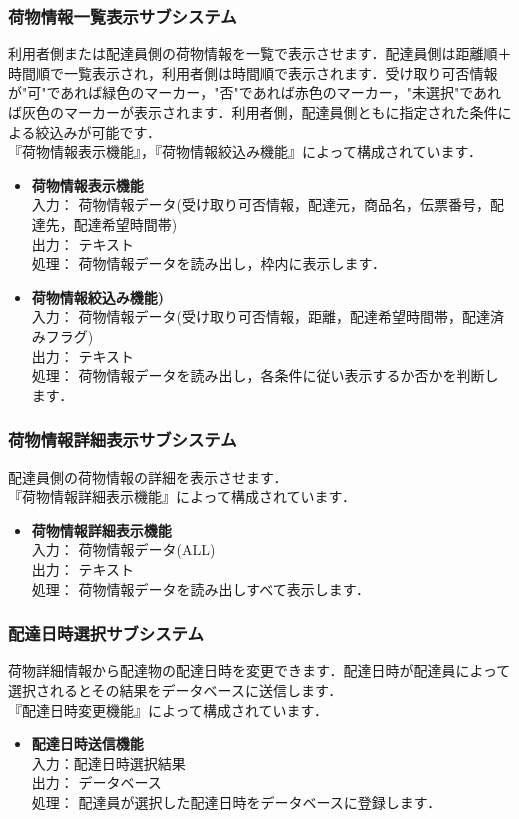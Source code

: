 \documentclass[a4j,titlepage]{jarticle}
\begin{document}
\subsubsection{荷物情報一覧表示サブシステム}
利用者側または配達員側の荷物情報を一覧で表示させます．配達員側は距離順＋時間順で一覧表示され，利用者側は時間順で表示されます．受け取り可否情報が"可"であれば緑色のマーカー，"否"であれば赤色のマーカー，"未選択"であれば灰色のマーカーが表示されます．利用者側，配達員側ともに指定された条件による絞込みが可能です．\\
『荷物情報表示機能』，『荷物情報絞込み機能』によって構成されています．
\begin{itemize}
\item \textbf{荷物情報表示機能} \\
入力： 荷物情報データ(受け取り可否情報，配達元，商品名，伝票番号，配達先，配達希望時間帯) \\
出力： テキスト \\
処理： 荷物情報データを読み出し，枠内に表示します．
\item \textbf{荷物情報絞込み機能)} \\
入力： 荷物情報データ(受け取り可否情報，距離，配達希望時間帯，配達済みフラグ) \\
出力： テキスト \\
処理： 荷物情報データを読み出し，各条件に従い表示するか否かを判断します．
\end{itemize}

\subsubsection{荷物情報詳細表示サブシステム}
配達員側の荷物情報の詳細を表示させます．\\
『荷物情報詳細表示機能』によって構成されています．
\begin{itemize}
\item \textbf{荷物情報詳細表示機能} \\
入力： 荷物情報データ(ALL) \\
出力： テキスト \\
処理： 荷物情報データを読み出しすべて表示します．
\end{itemize}

\subsubsection{配達日時選択サブシステム}
荷物詳細情報から配達物の配達日時を変更できます．配達日時が配達員によって選択されるとその結果をデータベースに送信します．\\
『配達日時変更機能』によって構成されています．
\begin{itemize}
\item \textbf{配達日時送信機能} \\
入力：配達日時選択結果 \\
出力： データベース \\
処理： 配達員が選択した配達日時をデータベースに登録します．
\end{itemize}
\end{document}
